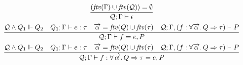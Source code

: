 \begin{gather*}
  \infer{\mathcal{Q}; \Gamma \vdash \epsilon}{
    (\mathit{ftv}(\Gamma) \cup \mathit{ftv}(\mathcal{Q})) = \emptyset
  }
  \\
  \infer{\mathcal{Q}; \Gamma \vdash f = e, P}{
    \mathcal{Q} \land Q_1 \Vdash Q_2
    &
    Q_1; \Gamma \vdash e: \tau
    &
    \overrightarrow{\alpha} = \mathit{ftv}(Q) \cup \mathit{ftv}(\tau)
    &
    \mathcal{Q}; \Gamma, (f: \forall \overrightarrow{\alpha}\ldotp Q \Rightarrow \tau) \vdash P
  }
  \\
  \infer{\mathcal{Q}; \Gamma \vdash f: \forall \overrightarrow{\alpha}\ldotp Q \Rightarrow \tau = e, P}{
    \mathcal{Q} \land Q_1 \Vdash Q_2
    &
    Q_1; \Gamma \vdash e: \tau
    &
    \overrightarrow{\alpha} = \mathit{ftv}(Q) \cup \mathit{ftv}(\tau)
    &
    \mathcal{Q}; \Gamma, (f: \forall \overrightarrow{\alpha}\ldotp Q \Rightarrow \tau) \vdash P
  }
\end{gather*}
